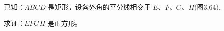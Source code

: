 \begin{example}
已知：$ABCD$ 是矩形，设各外角的平分线相交于 $E$、$F$、$G$、$H$(图3.64). 

求证：$EFGH$ 是正方形。
\end{example}

\begin{figure}
\begin{tikzpicture}
\end{tikzpicture} 
    \caption{}
\end{figure}


